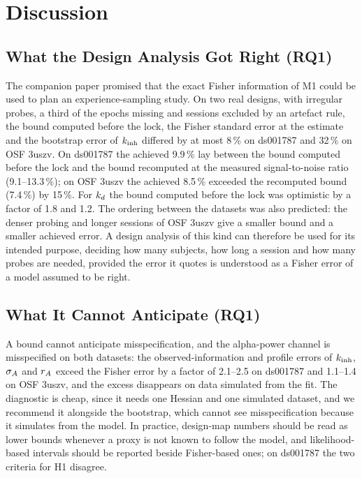 \section{Discussion}
\label{sec:discussion}

\subsection{What the Design Analysis Got Right (RQ1)}
The companion paper promised that the exact Fisher information of M1 could be used to plan an experience-sampling study. On two real designs, with irregular probes, a third of the epochs missing and sessions excluded by an artefact rule, the bound computed before the lock, the Fisher standard error at the estimate and the bootstrap error of $k_{\mathrm{inh}}$ differed by at most 8\,\% on ds001787 and 32\,\% on OSF 3uszv. On ds001787 the achieved 9.9\,\% lay between the bound computed before the lock and the bound recomputed at the measured signal-to-noise ratio (9.1--13.3\,\%); on OSF 3uszv the achieved 8.5\,\% exceeded the recomputed bound (7.4\,\%) by 15\,\%. For $k_{d}$ the bound computed before the lock was optimistic by a factor of 1.8 and 1.2. The ordering between the datasets was also predicted: the denser probing and longer sessions of OSF 3uszv give a smaller bound and a smaller achieved error. A design analysis of this kind can therefore be used for its intended purpose, deciding how many subjects, how long a session and how many probes are needed, provided the error it quotes is understood as a Fisher error of a model assumed to be right.

\subsection{What It Cannot Anticipate (RQ1)}
A bound cannot anticipate misspecification, and the alpha-power channel is misspecified on both datasets: the observed-information and profile errors of $k_{\mathrm{inh}}$, $\sigma_{A}$ and $r_{A}$ exceed the Fisher error by a factor of 2.1--2.5 on ds001787 and 1.1--1.4 on OSF 3uszv, and the excess disappears on data simulated from the fit. The diagnostic is cheap, since it needs one Hessian and one simulated dataset, and we recommend it alongside the bootstrap, which cannot see misspecification because it simulates from the model. In practice, design-map numbers should be read as lower bounds whenever a proxy is not known to follow the model, and likelihood-based intervals should be reported beside Fisher-based ones; on ds001787 the two criteria for H1 disagree.

